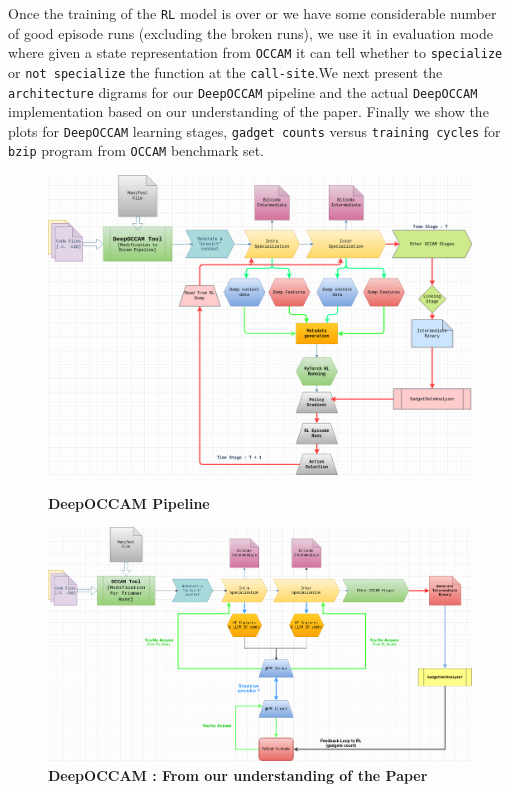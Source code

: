 \documentclass{relatorio}
\begin{document}
Once the training of the \texttt{RL} model is over or we have some considerable number of good episode runs (excluding the broken runs), we use it in evaluation mode where given a state representation from \texttt{OCCAM} it can tell whether to \texttt{specialize} or \texttt{not specialize} the function at the \texttt{call-site}.We next present the \texttt{architecture} digrams for our \texttt{DeepOCCAM} pipeline and the actual \texttt{DeepOCCAM} implementation based on our understanding of the paper. 
Finally we show the plots for \texttt{DeepOCCAM} learning stages, \texttt{gadget counts} versus \texttt{training cycles} for \texttt{bzip} program from \texttt{OCCAM} benchmark set.

\onecolumn
\begin{figure}[H]
	\centering
	\captionsetup{justification=centering}
	\includegraphics[width=1\linewidth]{imgs/deepoccam-pipeline.png}
	\caption{\textbf{DeepOCCAM Pipeline}}%
	\label{fig:plant}
	\centering
	\captionsetup{justification=centering}
	\includegraphics[width=1\linewidth]{imgs/DeepOCCAM-Pipeline.png}
	\caption{\textbf{DeepOCCAM : \color{blue} From our understanding of the Paper}}%
	\label{fig:plant}
\end{figure}
\twocolumn
\end{document}
